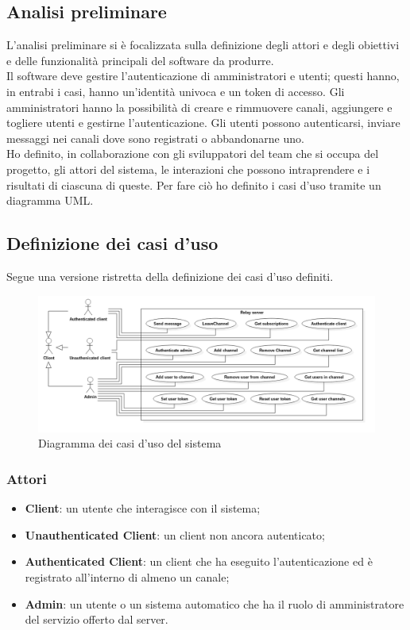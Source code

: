 	 \subsection{Analisi preliminare}
	 L'analisi preliminare si è focalizzata sulla definizione degli attori e degli obiettivi e delle funzionalità principali del software da produrre.
	 \\
	 Il software deve gestire l'autenticazione di amministratori e utenti; questi hanno, in entrabi i casi, hanno un'identità univoca e un token di accesso. Gli amministratori hanno la possibilità di creare e rimmuovere canali, aggiungere e togliere utenti e gestirne l'autenticazione.
	 Gli utenti possono autenticarsi, inviare messaggi nei canali dove sono registrati o abbandonarne uno.
	 \\
	 Ho definito, in collaborazione con gli sviluppatori del team che si occupa del progetto, gli attori del sistema, le interazioni che possono intraprendere e i risultati di ciascuna di queste. Per fare ciò ho definito i casi d'uso tramite un diagramma UML.\@

	 \subsection{Definizione dei casi d'uso}
	 Segue una versione ristretta della definizione dei casi d'uso definiti.
		\begin{figure}[H]
			\begin{center}
				\includegraphics[width=16.5cm,keepaspectratio]{UML/png/Use Case Model__Use Cases_0}
				\caption{Diagramma dei casi d'uso del sistema}
			\end{center}
		\end{figure}

		\subsubsection{Attori}
		\begin{itemize}
			\item \textbf{Client}: un utente che interagisce con il sistema;
			\item \textbf{Unauthenticated Client}: un client non ancora autenticato;
			\item \textbf{Authenticated Client}: un client che ha eseguito l'autenticazione ed è registrato all'interno di almeno un canale;
			\item \textbf{Admin}: un utente o un sistema automatico che ha il ruolo di amministratore del servizio offerto dal server.
		\end{itemize}

